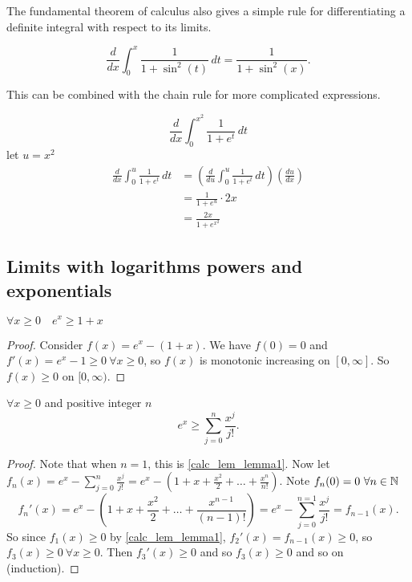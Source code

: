 \documentclass[10pt, a4paper]{article}
\begin{document}
The fundamental theorem of calculus also gives a simple rule for differentiating a definite integral with respect to its limits.
\begin{example}
    \[
    \frac{d}{dx}\int_0^x\frac{1}{1 + \sin ^ 2 (t)}\,dt = \frac{1}{1 + \sin ^ 2 (x)}.
    \]
\end{example}
This can be combined with the chain rule for more complicated expressions.
\begin{example}
    \[
    \frac{d}{dx}\int_0^{x ^ 2}\frac{1}{1 + e ^ t}\,dt
    \]
    let $u = x ^ 2$
    \begin{align*}
    \frac{d}{dx}\int_0^u\frac{1}{1 + e ^ t}\,dt &= \left(\frac{d}{du}\int_0^u\frac{1}{1 + e ^ t}\,dt\right)\left(\frac{du}{dx}\right) \\
    &= \frac{1}{1 + e ^ u} \cdot 2x \\
    &= \frac{2x}{1 + e ^ {x ^ 2}}
    \end{align*}
\end{example}

\subsection{Limits with logarithms powers and exponentials}
\begin{lemma}\label{calc_lem_lemma1}
    $\forall x \geq 0\quad e ^ x \geq 1 + x$
    \begin{proof}
        Consider $f(x) = e ^ x - (1 + x)$.
        We have $f(0) = 0$ and $f'(x) = e ^ x - 1 \geq 0\ \forall x \geq 0$,
        so $f(x)$ is monotonic increasing on $[0, \infty]$.
        So $f(x) \geq 0$ on $[0, \infty)$.
    \end{proof}
\end{lemma}
\begin{lemma}\label{calc_lem_lemma2}
    $\forall x \geq 0$ and positive integer $n$
    \[
    e ^ x \geq \sum_{j = 0}^{n}\frac{x ^ j}{j!}.
    \]
    \begin{proof}
        Note that when $n = 1$,
        this is \autoref{calc_lem_lemma1}.
        Now let $f_n(x) = e ^ x - \sum_{j = 0}^n\frac{x ^ j}{j!} = e ^ x - \left(1 + x + \frac{x ^ 2}{2} + \dotsc + \frac{x ^ n}{n!}\right)$.
        Note $f_n(0) = 0\ \forall n \in \mathbb{N}$
        \[
        f_n'(x) = e ^ x - \left(1 + x + \frac{x ^ 2}{2} + \dotsc + \frac{x ^ {n - 1}}{(n - 1)!}\right) = e ^ x - \sum_{j = 0}^{n = 1}\frac{x ^ j}{j!} = f_{n - 1}(x).
        \]
        So since $f_1(x) \geq 0$ by \autoref{calc_lem_lemma1},
        $f_2'(x) = f_{n - 1}(x) \geq 0$,
        so
        $f_3(x) \geq 0\ \forall x \geq 0$.
        Then $f_3'(x) \geq 0$ and so $f_3(x) \geq 0$ and so on (induction).
    \end{proof}
\end{lemma}
\end{document}
